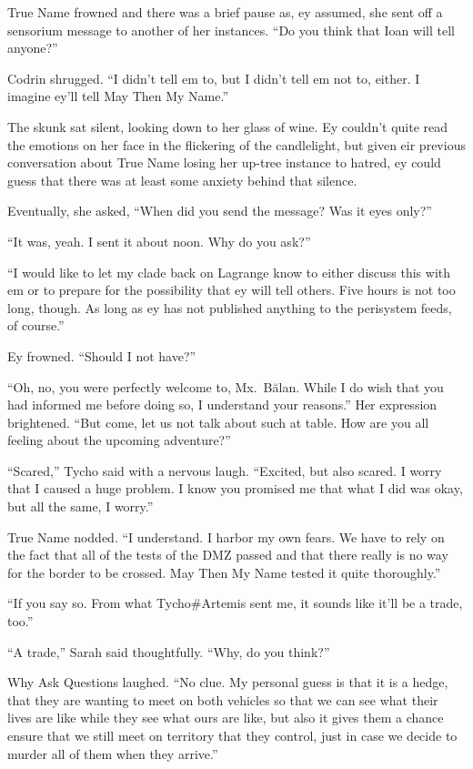 True Name frowned and there was a brief pause as, ey assumed, she sent off a sensorium message to another of her instances. ``Do you think that Ioan will tell anyone?''

Codrin shrugged. ``I didn't tell em to, but I didn't tell em not to, either. I imagine ey'll tell May Then My Name.''

The skunk sat silent, looking down to her glass of wine. Ey couldn't quite read the emotions on her face in the flickering of the candlelight, but given eir previous conversation about True Name losing her up-tree instance to hatred, ey could guess that there was at least some anxiety behind that silence.

Eventually, she asked, ``When did you send the message? Was it eyes only?''

``It was, yeah. I sent it about noon. Why do you ask?''

``I would like to let my clade back on Lagrange know to either discuss this with em or to prepare for the possibility that ey will tell others. Five hours is not too long, though. As long as ey has not published anything to the perisystem feeds, of course.''

Ey frowned. ``Should I not have?''

``Oh, no, you were perfectly welcome to, Mx.~Bălan. While I do wish that you had informed me before doing so, I understand your reasons.'' Her expression brightened. ``But come, let us not talk about such at table. How are you all feeling about the upcoming adventure?''

``Scared,'' Tycho said with a nervous laugh. ``Excited, but also scared. I worry that I caused a huge problem. I know you promised me that what I did was okay, but all the same, I worry.''

True Name nodded. ``I understand. I harbor my own fears. We have to rely on the fact that all of the tests of the DMZ passed and that there really is no way for the border to be crossed. May Then My Name tested it quite thoroughly.''

``If you say so. From what Tycho\#Artemis sent me, it sounds like it'll be a trade, too.''

``A trade,'' Sarah said thoughtfully. ``Why, do you think?''

Why Ask Questions laughed. ``No clue. My personal guess is that it is a hedge, that they are wanting to meet on both vehicles so that we can see what their lives are like while they see what ours are like, but also it gives them a chance ensure that we still meet on territory that they control, just in case we decide to murder all of them when they arrive.''

